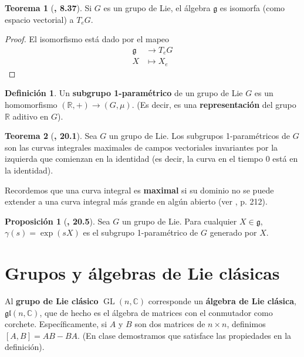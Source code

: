 \documentclass[spanish]{book}
\theoremstyle{definition}
\newtheorem*{defn}{Definición}
\newtheorem*{teo}{Teorema}
\newtheorem*{prop}{Proposición}
\newcommand{\R}{\mathbb{R}}
\newcommand{\C}{\mathbb{C}}
\begin{document}
	\begin{teo}[\cite{Lee}\textbf{, 8.37}]
		Si $G$ es un grupo de Lie, el álgebra $\mathfrak{g}$ es isomorfa (como espacio vectorial) a $T_eG$.
	\end{teo}
	\begin{proof}
		El isomorfismo está dado por el mapeo
		\begin{align*}
			\mathfrak{g}&\to T_eG\\
			X&\mapsto X_e
		\end{align*} 
	\end{proof}
	\begin{defn}
		Un \textbf{subgrupo 1-paramétrico} de un grupo de Lie $G$ es un homomorfismo $(\R,+)\to (G,\mu)$. (Es decir, es una \textbf{representación} del grupo $\R$ aditivo en $G$).
	\end{defn}
	\begin{teo}[\cite{Lee}\textbf{, 20.1}]
		Sea $G$ un grupo de Lie. Los subgrupos 1-paramétricos de $G$ son las curvas integrales maximales de campos vectoriales invariantes por la izquierda que comienzan en la identidad (es decir, la curva en el tiempo 0 está en la identidad).
	\end{teo}
	Recordemos que una curva integral es \textbf{maximal} si su dominio no se puede extender a una curva integral más grande en algún abierto (ver \cite{Lee}, p. 212).
	
	\begin{prop}[\cite{Lee}\textbf{, 20.5}]
		Sea $G$ un grupo de Lie. Para cualquier $X\in\mathfrak{g}$, $\gamma(s)=\exp(sX)$ es el subgrupo 1-paramétrico de $G$ generado por $X$.
		
		

	\end{prop}
	
	\section{Grupos y álgebras de Lie clásicas}
	Al \textbf{grupo de Lie clásico} $\operatorname{GL}(n,\C)$ corresponde un \textbf{álgebra de Lie clásica}, $\mathfrak{gl}(n,\C)$, que de hecho es el álgebra de matrices con el conmutador como corchete. Específicamente, si $A$ y $B$ son dos matrices de $n\times n$, definimos $[A,B]=AB-BA$. (En clase demostramos que satisface las propiedades en la definición).
	
\end{document}
